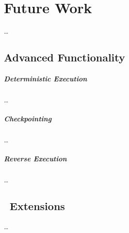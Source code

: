 
\chapter{Future Work}
\label{cha:futurework}
\ldots




\section{Advanced Functionality}
\label{sec:futurework_advancedfunctionality}

\paragraph{Deterministic Execution}
\label{par:futurework_advancedfunctionality_deterministicexecution}
\ldots

\paragraph{Checkpointing}
\label{par:futurework_advancedfunctionality_checkpointing}
\ldots

\paragraph{Reverse Execution}
\label{par:futurework_advancedfunctionality_reverseexecution}
\ldots

\section{\dvttermapi\ Extensions}
\label{sec:futurework_apiextensions}
\ldots

